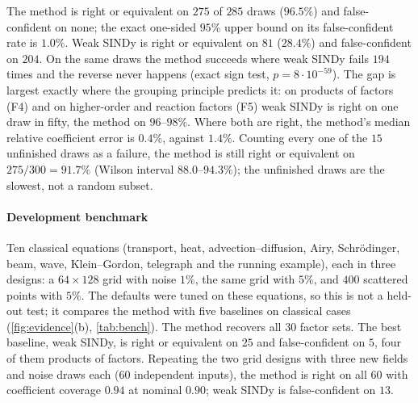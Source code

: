\documentclass[11pt]{article}
\theoremstyle{plain}
\theoremstyle{definition}
\theoremstyle{remark}
\begin{document}
The method is right or equivalent on $275$ of $285$ draws ($96.5\%$) and false-confident on none; the exact one-sided
$95\%$ upper bound on its false-confident rate is $1.0\%$. Weak SINDy is right or equivalent on $81$ ($28.4\%$) and
false-confident on $204$. On the same draws the method succeeds where weak SINDy fails $194$ times and the reverse never
happens (exact sign test, $p=8\cdot10^{-59}$). The gap is largest exactly where the grouping principle predicts it:
on products of factors (F4) and on higher-order and reaction factors (F5) weak SINDy is right on one draw in fifty,
the method on $96$--$98\%$. Where both are right, the method's median relative coefficient error is $0.4\%$, against
$1.4\%$. Counting every one of the $15$ unfinished draws as a failure, the method is still right or equivalent on
$275/300=91.7\%$ (Wilson interval $88.0$--$94.3\%$); the unfinished draws are the slowest, not a random subset.

\paragraph{Development benchmark} Ten classical equations (transport, heat, advection--diffusion, Airy, Schr\"odinger,
beam, wave, Klein--Gordon, telegraph and the running example), each in three designs: a $64\times128$ grid with noise $1\%$,
the same grid with $5\%$, and $400$ scattered points with $5\%$. The defaults were tuned on these equations, so this is not
a held-out test; it compares the method with five baselines on classical cases (\cref{fig:evidence}(b),
\cref{tab:bench}). The method recovers all $30$ factor sets. The best baseline, weak SINDy, is right or equivalent on $25$
and false-confident on $5$, four of them products of factors. Repeating the two grid designs with three new fields and
noise draws each ($60$ independent inputs), the method is right on all $60$ with coefficient coverage $0.94$ at nominal
$0.90$; weak SINDy is false-confident on $13$.
\end{document}
